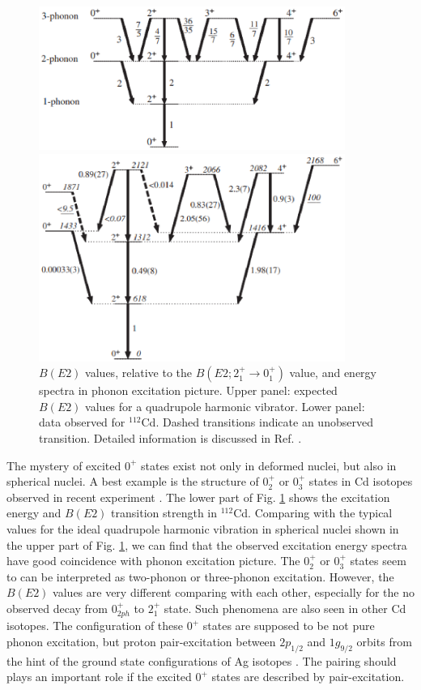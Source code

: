 \documentclass[11pt]{book} %
\begin{document}
\begin{figure}[tb]
 \begin{center}
    \includegraphics[width=100mm]{images/phonon.eps}
 \end{center}
 \begin{center}
    \includegraphics[width=100mm]{images/112Cd.eps}
 \end{center}
  \caption{$B(E2)$ values, relative to the $B(E2; 2_1^+\to 0_1^+)$ value, and energy spectra in phonon excitation picture. Upper panel: expected $B(E2)$ values for a quadrupole harmonic vibrator. Lower panel: data observed for ${}^{112}$Cd. Dashed transitions indicate an unobserved transition. Detailed information is discussed in Ref. \cite{GW10}.}
  \label{112Cd}
\end{figure}
The mystery of excited $0^+$ states exist not only in deformed nuclei, but also in spherical nuclei. A best example is the structure of $0_2^+$ or $0_3^+$ states in Cd isotopes observed in recent experiment \cite{GW10}. The lower part of Fig. \ref{112Cd} shows the excitation energy and $B(E2)$ transition strength in ${}^{112}$Cd. Comparing with the typical values for the ideal quadrupole harmonic vibration in spherical nuclei shown in the upper part of Fig. \ref{112Cd}, we can find that the observed excitation energy spectra have good coincidence with phonon excitation picture. The $0_2^+$ or $0_3^+$ states seem to can be interpreted as two-phonon or three-phonon excitation. However, the $B(E2)$ values are very different comparing with each other, especially for the no observed decay from $0_{2ph}^+$ to $2_1^+$ state. Such phenomena are also seen in other Cd isotopes. The configuration of these $0^+$ states are supposed to be not pure phonon excitation, but proton pair-excitation between $2p_{1/2}$ and $1g_{9/2}$ orbits from the hint of the ground state configurations of Ag isotopes \cite{HW11}. The pairing should plays an important role if the excited $0^+$ states are described by pair-excitation.
\end{document}
